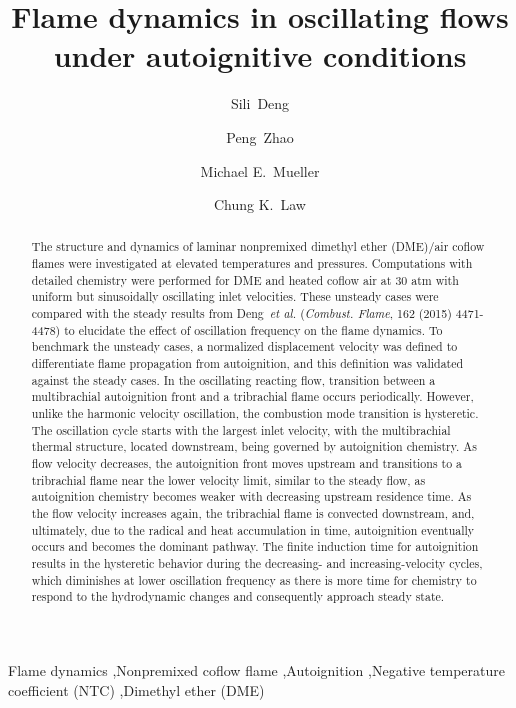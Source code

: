 \documentclass[review,3p,times]{elsarticle}
\begin{document}
\begin{frontmatter}

\title{Flame dynamics in oscillating flows under autoignitive conditions}

\author[Princeton]{Sili~Deng}
\author[Princeton,Oakland]{Peng~Zhao}
\author[Princeton]{Michael E.~Mueller}
\author[Princeton]{Chung K.~Law}

\address[Princeton]{Department of Mechanical and Aerospace Engineering, Princeton University, Princeton, NJ 08544, USA}
\address[Oakland]{Department of Mechanical Engineering, Oakland University, Rochester, MI 48309, USA}

\begin{abstract}

The structure and dynamics of laminar nonpremixed dimethyl ether (DME)/air coflow flames were investigated at elevated temperatures and pressures.  Computations with detailed chemistry were performed for DME and heated coflow air at $30$ atm with uniform but sinusoidally oscillating inlet velocities.  These unsteady cases were compared with the steady results from Deng~\emph{et al.} (\emph{Combust. Flame}, 162 (2015) 4471-4478) to elucidate the effect of oscillation frequency on the flame dynamics.  To benchmark the unsteady cases, a normalized displacement velocity was defined to differentiate flame propagation from autoignition, and this definition was validated against the steady cases.  In the oscillating reacting flow, transition between a multibrachial autoignition front and a tribrachial flame occurs periodically.  However, unlike the harmonic velocity oscillation, the combustion mode transition is hysteretic.  The oscillation cycle starts with the largest inlet velocity, with the multibrachial thermal structure, located downstream, being governed by autoignition chemistry.  As flow velocity decreases, the autoignition front moves upstream and transitions to a tribrachial flame near the lower velocity limit, similar to the steady flow, as autoignition chemistry becomes weaker with decreasing upstream residence time.  As the flow velocity increases again, the tribrachial flame is convected downstream, and, ultimately, due to the radical and heat accumulation in time, autoignition eventually occurs and becomes the dominant pathway.  The finite induction time for autoignition results in the hysteretic behavior during the decreasing- and increasing-velocity cycles, which diminishes at lower oscillation frequency as there is more time for chemistry to respond to the hydrodynamic changes and consequently approach steady state.  

\end{abstract}

\begin{keyword} 
Flame dynamics \sep Nonpremixed coflow flame \sep Autoignition \sep Negative temperature coefficient (NTC) \sep Dimethyl ether (DME) 
\end{keyword}

\end{frontmatter}
\end{document}
